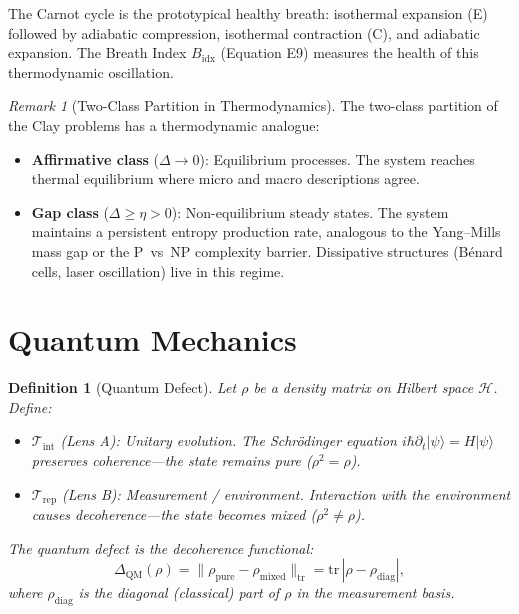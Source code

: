 \documentclass[12pt, openany]{book}
\newtheorem{definition}[theorem]{Definition}
\theoremstyle{remark}
\newtheorem{remark}[theorem]{Remark}
\newcommand{\Tint}{\mathcal{T}_{\mathrm{int}}}
\newcommand{\Trep}{\mathcal{T}_{\mathrm{rep}}}
\newcommand{\Hilb}{\mathcal{H}}
\begin{document}
\noindent
The Carnot cycle is the prototypical healthy breath: isothermal expansion (E) followed by
adiabatic compression, isothermal contraction (C), and adiabatic expansion.  The
Breath Index $B_{\mathrm{idx}}$ (Equation E9) measures the health of this thermodynamic
oscillation.

\begin{remark}[Two-Class Partition in Thermodynamics]
The two-class partition of the Clay problems has a thermodynamic analogue:
\begin{itemize}
  \item \textbf{Affirmative class} ($\Delta \to 0$): Equilibrium processes.
        The system reaches thermal equilibrium where micro and macro descriptions agree.
  \item \textbf{Gap class} ($\Delta \geq \eta > 0$): Non-equilibrium steady states.
        The system maintains a persistent entropy production rate, analogous to
        the Yang--Mills mass gap or the P~vs~NP complexity barrier.
        Dissipative structures (B\'enard cells, laser oscillation) live in this regime.
\end{itemize}
\end{remark}


\section{Quantum Mechanics}
\label{sec:qm}

\begin{definition}[Quantum Defect]
\label{def:quantum-defect}
Let $\rho$ be a density matrix on Hilbert space $\Hilb$.  Define:
\begin{itemize}
  \item $\Tint$ (Lens A): Unitary evolution.  The Schr\"odinger equation
        $i\hbar \partial_t |\psi\rangle = H|\psi\rangle$ preserves coherence---the
        state remains pure ($\rho^2 = \rho$).
  \item $\Trep$ (Lens B): Measurement / environment.  Interaction with the
        environment causes decoherence---the state becomes mixed ($\rho^2 \neq \rho$).
\end{itemize}
The quantum defect is the decoherence functional:
\[
  \Delta_{\mathrm{QM}}(\rho) = \|\rho_{\mathrm{pure}} - \rho_{\mathrm{mixed}}\|_{\mathrm{tr}}
  = \mathrm{tr}\,|\rho - \rho_{\mathrm{diag}}|,
\]
where $\rho_{\mathrm{diag}}$ is the diagonal (classical) part of $\rho$ in the
measurement basis.
\end{definition}
\end{document}
